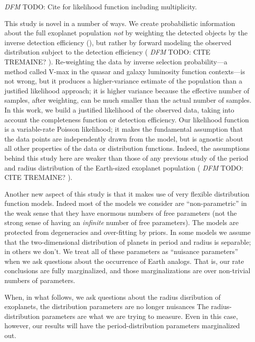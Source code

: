 \documentclass[12pt,preprint]{aastex}
\newcommand{\todo}[3]{{\color{#2} \emph{#1} TODO: #3}}
\newcommand{\dfmtodo}[1]{\todo{DFM}{red}{#1}}
\begin{document}
\dfmtodo{%
Cite \citet{tremaine} for likelihood function including multiplicity.
}

This study is novel in a number of ways.
We create probabilistic information about the full exoplanet population
\emph{not} by weighting the detected objects by the inverse detection
efficiency (\citealt{petigura}), but rather by forward modeling the
observed distribution subject to the detection efficiency
(\dfmtodo{CITE TREMAINE?} \citealt{dong}).
Re-weighting the data by inverse selection probability---a method called
V-max in the quasar and galaxy luminosity function contexts---is not wrong,
but it produces a higher-variance estimate of the population than a justified
likelihood approach; it is higher variance because
the effective number of samples, after
weighting, can be much smaller than the actual number of samples.
In this work, we build a justified
likelihood of the observed data, taking into account the completeness function
or detection efficiency.
Our likelihood function is a variable-rate Poisson likelihood; it makes the
fundamental assumption that the data points are independently drawn from the
model, but is agnostic about all other properties of the data or distribution
functions.
Indeed, the assumptions behind this study here are weaker than those of any
previous study of the period and radius distribution of the Earth-sized
exoplanet population (\dfmtodo{CITE TREMAINE?} \citealt{dong, petigura}).

Another new aspect of this study is that it makes use of very flexible
distribution function models.
Indeed most of the models we consider are ``non-parametric'' in the weak sense
that they have enormous numbers of free parameters (not the strong sense of
having an \emph{infinite} number of free parameters).
The models are protected from degeneracies and over-fitting by priors.
In some models we assume that the two-dimensional distribution of planets in
period and radius is separable; in others we don't.
We treat all of these parameters as ``nuisance parameters'' when we ask
questions about the occurrence of Earth analogs.
That is, our rate conclusions are fully marginalized, and those
marginalizations are over non-trivial numbers of parameters.

When, in what follows, we ask questions about the radius disribution of
exoplanets, the distribution parameters are no longer nuisances The
radius-distribution parameters are what we are trying to measure.
Even in this case, however, our results will have the period-distribution
parameters marginalized out.
\end{document}
